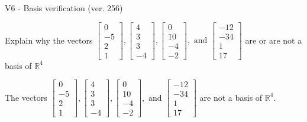 \begin{exercise}
  \begin{exerciseTitle}V6 - Basis verification (ver. 256)\end{exerciseTitle}
  \begin{exerciseStatement}
    Explain why the vectors \(\left[\begin{array}{r}
0 \\
-5 \\
2 \\
1
\end{array}\right] , \left[\begin{array}{r}
4 \\
3 \\
3 \\
-4
\end{array}\right] , \left[\begin{array}{r}
0 \\
10 \\
-4 \\
-2
\end{array}\right] , \text{ and } \left[\begin{array}{r}
-12 \\
-34 \\
1 \\
17
\end{array}\right]\) are or are not a basis of \(\mathbb{R}^4\)	


  \end{exerciseStatement}
  \begin{exerciseAnswer}
   The vectors \(\left[\begin{array}{r}
0 \\
-5 \\
2 \\
1
\end{array}\right] , \left[\begin{array}{r}
4 \\
3 \\
3 \\
-4
\end{array}\right] , \left[\begin{array}{r}
0 \\
10 \\
-4 \\
-2
\end{array}\right] , \text{ and } \left[\begin{array}{r}
-12 \\
-34 \\
1 \\
17
\end{array}\right]\) 
  	 are not  a basis of \(\mathbb{R}^4\).
  


  \end{exerciseAnswer}
\end{exercise}
